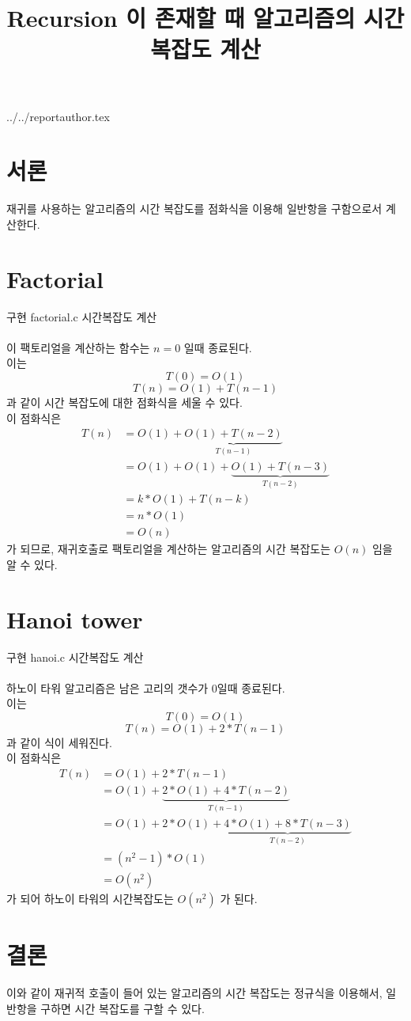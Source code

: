 \documentclass {article}
\begin{document}
\title {Recursion 이 존재할 때 알고리즘의 시간복잡도 계산}
 {../../reportauthor.tex}
\maketitle

\section{서론}
재귀를 사용하는 알고리즘의 시간 복잡도를 점화식을 이용해 일반항을 구함으로서 계산한다.
\section{Factorial}
구현
{factorial.c}
시간복잡도 계산
\\\\
이 팩토리얼을 계산하는 함수는 $ n = 0 $ 일때 종료된다. \\
이는
\begin {equation}
  T(0) = O(1)
\end {equation}
\begin {equation}
  T(n) = O(1) + T(n - 1)
\end {equation}
과 같이 시간 복잡도에 대한 점화식을 세울 수 있다. \\
이 점화식은
\begin {align*}
  T(n) &= O(1) + \underbrace { O(1) + T(n-2) }_{ T(n-1) } \\
       &= O(1) + O(1) + \underbrace { O(1) + T(n-3)}_{ T(n-2) }\\
       &= k * O(1) + T(n - k) \\
       &= n * O(1) \\
       &= O(n)
\end {align*}
가 되므로, 재귀호출로 팩토리얼을 계산하는 알고리즘의 시간 복잡도는 $ O(n) $ 임을 알 수 있다.
\section{Hanoi tower}
구현
{hanoi.c}
시간복잡도 계산
\\\\
하노이 타워 알고리즘은 남은 고리의 갯수가 0일때 종료된다. \\
이는
\begin {equation}
  T(0) = O(1)
\end {equation}
\begin {equation}
  T(n) = O(1) + 2*T(n-1)
\end {equation}
과 같이 식이 세워진다. \\
이 점화식은
\begin {align*}
  T(n) &= O(1) + 2*T(n-1) \\
       &= O(1) + \underbrace {2*O(1) + 4*T(n-2)}_{T(n-1)} \\
       &= O(1) + 2*O(1) + \underbrace {4*O(1) + 8*T(n-3)}_{T(n-2)} \\
       &= (n^2 - 1) * O(1) \\
       &= O(n^2)
\end {align*}
가 되어 하노이 타워의 시간복잡도는 $ O(n^2) $ 가 된다.

\section {결론}
이와 같이 재귀적 호출이 들어 있는 알고리즘의 시간 복잡도는 정규식을 이용해서, 일반항을 구하면 시간 복잡도를 구할 수 있다.
\end{document}
